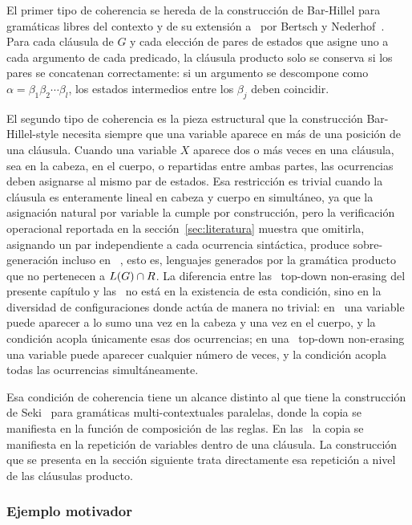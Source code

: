 El primer tipo de coherencia se hereda de la construcción de Bar-Hillel para gramáticas libres del contexto y de su extensión a \sRCG\ por Bertsch y Nederhof~\cite{REF}. Para cada cláusula de $G$ y cada elección de pares de estados que asigne uno a cada argumento de cada predicado, la cláusula producto solo se conserva si los pares se concatenan correctamente: si un argumento se descompone como $\alpha = \beta_1 \beta_2 \cdots \beta_l$, los estados intermedios entre los $\beta_j$ deben coincidir.

El segundo tipo de coherencia es la pieza estructural que la construcción Bar-Hillel-style necesita siempre que una variable aparece en más de una posición de una cláusula. Cuando una variable $X$ aparece dos o más veces en una cláusula, sea en la cabeza, en el cuerpo, o repartidas entre ambas partes, las ocurrencias deben asignarse al mismo par de estados. Esa restricción es trivial cuando la cláusula es enteramente lineal en cabeza y cuerpo en simultáneo, ya que la asignación natural por variable la cumple por construcción, pero la verificación operacional reportada en la sección~\ref{sec:literatura} muestra que omitirla, asignando un par independiente a cada ocurrencia sintáctica, produce sobre-generación incluso en \sRCG~\cite{REF}, esto es, lenguajes generados por la gramática producto que no pertenecen a $L(G) \cap R$. La diferencia entre las \PRCG\ top-down non-erasing del presente capítulo y las \sRCG\ no está en la existencia de esta condición, sino en la diversidad de configuraciones donde actúa de manera no trivial: en \sRCG\ una variable puede aparecer a lo sumo una vez en la cabeza y una vez en el cuerpo, y la condición acopla únicamente esas dos ocurrencias; en una \PRCG\ top-down non-erasing una variable puede aparecer cualquier número de veces, y la condición acopla todas las ocurrencias simultáneamente.

Esa condición de coherencia tiene un alcance distinto al que tiene la construcción de Seki~\cite{REF} para gramáticas multi-contextuales paralelas, donde la copia se manifiesta en la función de composición de las reglas. En las \PRCG\ la copia se manifiesta en la repetición de variables dentro de una cláusula. La construcción que se presenta en la sección siguiente trata directamente esa repetición a nivel de las cláusulas producto.

\subsubsection{Ejemplo motivador}

